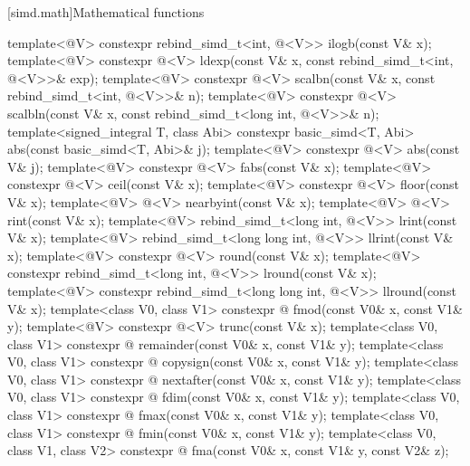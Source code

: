 [simd.math]{Mathematical functions}

\begin{itemdecl}
template<@\mathfloatingpoint@ V> constexpr rebind_simd_t<int, @\deducedsimd@<V>> ilogb(const V& x);
template<@\mathfloatingpoint@ V> constexpr @\deducedsimd@<V> ldexp(const V& x, const
rebind_simd_t<int, @\deducedsimd@<V>>& exp);
template<@\mathfloatingpoint@ V> constexpr @\deducedsimd@<V> scalbn(const V& x, const
rebind_simd_t<int, @\deducedsimd@<V>>& n);
template<@\mathfloatingpoint@ V>
  constexpr @\deducedsimd@<V> scalbln(const V& x, const rebind_simd_t<long int, @\deducedsimd@<V>>& n);
template<signed_integral T, class Abi>
  constexpr basic_simd<T, Abi> abs(const basic_simd<T, Abi>& j);
template<@\mathfloatingpoint@ V> constexpr @\deducedsimd@<V> abs(const V& j);
template<@\mathfloatingpoint@ V> constexpr @\deducedsimd@<V> fabs(const V& x);
template<@\mathfloatingpoint@ V> constexpr @\deducedsimd@<V> ceil(const V& x);
template<@\mathfloatingpoint@ V> constexpr @\deducedsimd@<V> floor(const V& x);
template<@\mathfloatingpoint@ V> @\deducedsimd@<V> nearbyint(const V& x);
template<@\mathfloatingpoint@ V> @\deducedsimd@<V> rint(const V& x);
template<@\mathfloatingpoint@ V> rebind_simd_t<long int, @\deducedsimd@<V>> lrint(const V& x);
template<@\mathfloatingpoint@ V> rebind_simd_t<long long int, @\deducedsimd@<V>> llrint(const V& x);
template<@\mathfloatingpoint@ V> constexpr @\deducedsimd@<V> round(const V& x);
template<@\mathfloatingpoint@ V> constexpr rebind_simd_t<long int, @\deducedsimd@<V>> lround(const V& x);
template<@\mathfloatingpoint@ V> constexpr rebind_simd_t<long long int, @\deducedsimd@<V>> llround(const V& x);
template<class V0, class V1>
  constexpr @ fmod(const V0& x, const V1& y);
template<@\mathfloatingpoint@ V> constexpr @\deducedsimd@<V> trunc(const V& x);
template<class V0, class V1>
  constexpr @ remainder(const V0& x, const V1& y);
template<class V0, class V1>
  constexpr @ copysign(const V0& x, const V1& y);
template<class V0, class V1>
  constexpr @ nextafter(const V0& x, const V1& y);
template<class V0, class V1>
  constexpr @ fdim(const V0& x, const V1& y);
template<class V0, class V1>
  constexpr @ fmax(const V0& x, const V1& y);
template<class V0, class V1>
  constexpr @ fmin(const V0& x, const V1& y);
template<class V0, class V1, class V2>
  constexpr @ fma(const V0& x, const V1& y, const V2& z);

\end{itemdecl}
